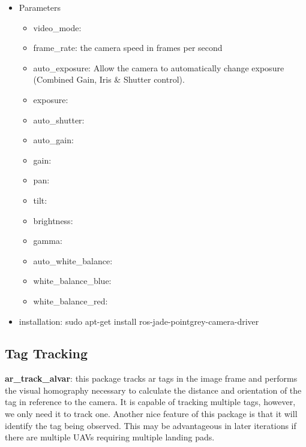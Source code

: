 \begin{itemize}
\item Parameters
\begin{itemize}
\item video\_mode:
\item frame\_rate:  the camera speed in frames per second
\item auto\_exposure:  Allow the camera to automatically change exposure (Combined Gain, Iris \& Shutter control).
\item exposure: 
\item auto\_shutter:
\item auto\_gain:
\item gain:
\item pan:
\item tilt:
\item brightness:
\item gamma:
\item auto\_white\_balance:
\item white\_balance\_blue:
\item white\_balance\_red:
\end{itemize}
\item installation: sudo apt-get install ros-jade-pointgrey-camera-driver
\end{itemize}

\subsection{Tag Tracking}
\noindent \textbf{ar\_track\_alvar}: this package tracks ar tags in the image frame and performs the visual homography necessary to calculate the distance and orientation of the tag in reference to the camera. It is capable of tracking multiple tags, however, we only need it to track one. Another nice feature of this package is that it will identify the tag being observed. This may be advantageous in later iterations if there are multiple UAVs requiring multiple landing pads.



